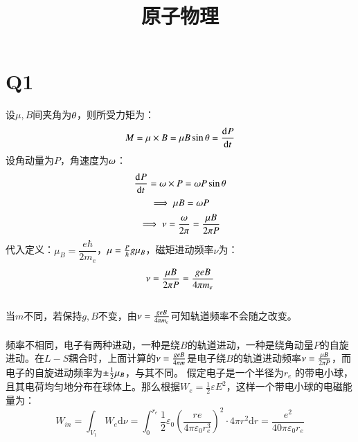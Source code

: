 \documentclass[UTF8,9pt]{ctexart}
\title{原子物理}
\begin{document}
 
    \maketitle 
    \section{Q1}   
        设$\mu,B $间夹角为$\theta$，则所受力矩为：
        $$M=\mu\times B=\mu B\sin\theta=\frac{\mathrm{d}^{} P}{\mathrm{d} t^{}}$$
        设角动量为$P$，角速度为$\omega$：
        $$\frac{\mathrm{d}^{} P}{\mathrm{d} t^{}}=\omega\times P=\omega P\sin\theta$$ 
        $$\implies \mu B=\omega P$$ 
        $$\implies \nu=\frac{\omega}{2\pi}=\frac{\mu B}{2\pi P}$$
        代入定义：$\mu_B=\dfrac{e\hbar}{2m_e}$，$\mu=\frac{P}{\hbar}g\mu_B$，磁矩进动频率$\nu$为：\\
        $$ \nu=\frac{\mu B}{2\pi P}=\frac{geB}{4\pi m_e}$$
        \\
        当$m$不同，若保持$g,B$不变，由$\nu=\frac{geB}{4\pi m_e}$可知轨道频率不会随之改变。\\
        \\
        频率不相同，电子有两种进动，一种是绕$B$的轨道进动，一种是绕角动量$P$的自旋进动。在$L-S$耦合时，上面计算的$\nu=\frac{geB}{4\pi m}$是电子绕$B$的轨道进动频率$\nu=\frac{\mu B}{2\pi P}$，而电子的自旋进动频率为$\pm \frac{1}{2}\mu_B$，与其不同。
        假定电子是一个半径为$r_e$ 的带电小球，且其电荷均匀地分布在球体上。那么根据$W _ { e } = \frac { 1 } { 2 } \varepsilon E ^ { 2 }$，这样一个带电小球的电磁能量为： 
        $$W _ {in} = \int _ { V _ { 1 } } W _ { e } \mathrm { d } \nu= \int _ { 0 } ^ { r_e } \frac { 1 } { 2 } \varepsilon _ { 0 }\left( \frac { re } { 4 \pi \varepsilon _ { 0 }  r_e ^ { 3 } } \right) ^ { 2 } \cdot 4 \pi r ^ { 2 } \mathrm { d } r= \frac { e ^ { 2 } } { 40 \pi \varepsilon _ { 0 }r_e }$$
\end{document}
